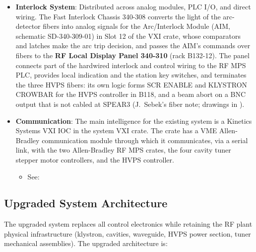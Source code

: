 {\begin{itemize}
  \begin{itemize}
  \tightlist
  \item
    See: , 
  \end{itemize}
\item
  \textbf{Interlock System}: Distributed across analog modules, PLC I/O, and direct wiring. The Fast Interlock Chassis 340-308 converts the light of the arc-detector fibers into analog signals for the Arc/Interlock Module (AIM, schematic SD-340-309-01) in Slot 12 of the VXI crate, whose comparators and latches make the arc trip decision, and passes the AIM's commands over fibers to the \textbf{RF Local Display Panel 340-310} (rack B132-12). The panel connects part of the hardwired interlock and control wiring to the RF MPS PLC, provides local indication and the station key switches, and terminates the three HVPS fibers: its own logic forms SCR ENABLE and KLYSTRON CROWBAR for the HVPS controller in B118, and a beam abort on a BNC output that is not cabled at SPEAR3 (J.~Sebek's fiber note; drawings in ).
\item
  \textbf{Communication}: The main intelligence for the existing system is a Kinetics Systems VXI IOC in the system VXI crate. The crate has a VME Allen-Bradley communication module through which it communicates, via a serial link, with the two Allen-Bradley RF MPS crates, the four cavity tuner stepper motor controllers, and the HVPS controller.

  \begin{itemize}
  \tightlist
  \item
    See: 
  \end{itemize}
\end{itemize}

\subsection{Upgraded System Architecture}\label{upgraded-system-architecture}

The upgraded system replaces all control electronics while retaining the RF plant physical infrastructure (klystron, cavities, waveguide, HVPS power section, tuner mechanical assemblies). The upgraded architecture is:

}
